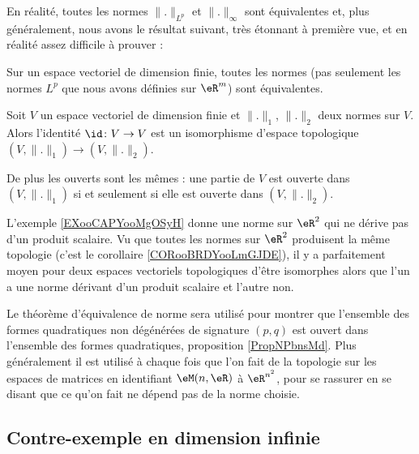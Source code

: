 En réalité, toutes les normes \( \| . \|_{L^p}\) et \( \| . \|_{\infty}\) sont équivalentes et, plus généralement, nous avons le résultat suivant, très étonnant à première vue, et en réalité assez difficile à prouver :
\begin{theorem}		\label{ThoNormesEquiv}
	Sur un espace vectoriel de dimension finie, toutes les normes (pas seulement les normes $L^p$ que nous avons définies sur $\eR^m$) sont équivalentes.
\end{theorem}

\begin{corollary}       \label{CORooBRDYooLmGJDE}
    Soit \( V\) un espace vectoriel de dimension finie et \( \| . \|_1\), \( \| . \|_2\) deux normes sur \( V\). Alors l'identité \( \id\colon V\to V\) est un isomorphisme d'espace topologique \( (V,\| . \|_1)\to (V,\| . \|_2)\).

    De plus les ouverts sont les mêmes : une partie de \( V\) est ouverte dans \( (V,\| . \|_1)\) si et seulement si elle est ouverte dans \( (V,\| . \|_2)\).
\end{corollary}

\begin{normaltext}
    L'exemple \ref{EXooCAPYooMgOSyH} donne une norme sur \( \eR^2\) qui ne dérive pas d'un produit scalaire. Vu que toutes les normes sur \( \eR^2\) produisent la même topologie (c'est le corollaire \ref{CORooBRDYooLmGJDE}), il y a parfaitement moyen pour deux espaces vectoriels topologiques d'être isomorphes alors que l'un a une norme dérivant d'un produit scalaire et l'autre non.
\end{normaltext}

Le théorème d'équivalence de norme sera utilisé pour montrer que l'ensemble des formes quadratiques non dégénérées de signature \( (p,q)\) est ouvert dans l'ensemble des formes quadratiques, proposition \ref{PropNPbnsMd}. Plus généralement il est utilisé à chaque fois que l'on fait de la topologie sur les espaces de matrices en identifiant \( \eM(n,\eR)\) à \( \eR^{n^2}\), pour se rassurer en se disant que ce qu'on fait ne dépend pas de la norme choisie.

\subsection{Contre-exemple en dimension infinie}
\label{SubSecPOlynomesCE}

